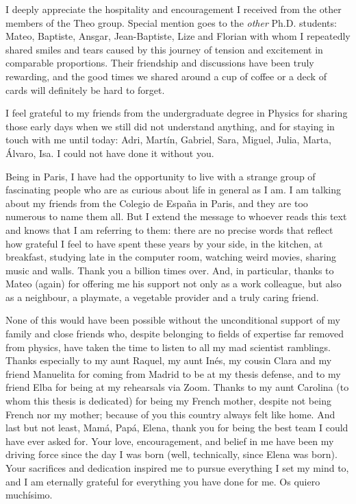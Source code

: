 I deeply appreciate the hospitality and encouragement I received from the other members of the Theo group. Special mention goes to the {\em other} Ph.D. students: Mateo, Baptiste, Ansgar, Jean-Baptiste, Lize and Florian with whom I repeatedly shared smiles and tears caused by this journey of tension and excitement in comparable proportions. Their friendship and discussions have been truly rewarding, and the good times we shared around a cup of coffee or a deck of cards will definitely be hard to forget.

I feel grateful to my friends from the undergraduate degree in Physics for sharing those early days when we still did not understand anything, and for staying in touch with me until today: Adri, Martín, Gabriel, Sara, Miguel, Julia, Marta, Álvaro, Isa. I could not have done it without you.

Being in Paris, I have had the opportunity to live with a strange group of fascinating people who are as curious about life in general as I am. I am talking about my friends from the Colegio de España in Paris, and they are too numerous to name them all. But I extend the message to whoever reads this text and knows that I am referring to them: there are no precise words that reflect how grateful I feel to have spent these years by your side, in the kitchen, at breakfast, studying late in the computer room, watching weird movies, sharing music and walls. Thank you a billion times over. And, in particular, thanks to Mateo (again) for offering me his support not only as a work colleague, but also as a neighbour, a playmate, a vegetable provider and a truly caring friend.

None of this would have been possible without the unconditional support of my family and close friends who, despite belonging to fields of expertise far removed from physics, have taken the time to listen to all my mad scientist ramblings. Thanks especially to my aunt Raquel, my aunt Inés, my cousin Clara and my friend Manuelita for coming from Madrid to be at my thesis defense, and to my friend Elba for being at my rehearsals via Zoom. Thanks to my aunt Carolina (to whom this thesis is dedicated) for being my French mother, despite not being French nor my mother; because of you this country always felt like home. And last but not least, Mamá, Papá, Elena, thank you for being the best team I could have ever asked for. Your love, encouragement, and belief in me have been my driving force since the day I was born (well, technically, since Elena was born). Your sacrifices and dedication inspired me to pursue everything I set my mind to, and I am eternally grateful for everything you have done for me. Os quiero muchísimo.
